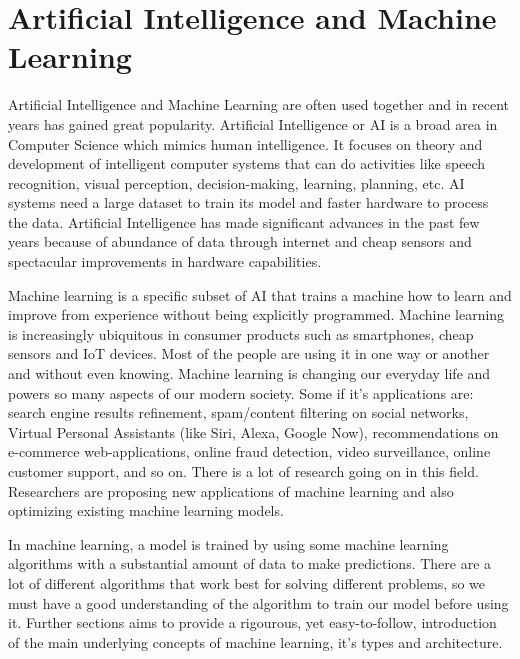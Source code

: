 \section{Artificial Intelligence and Machine Learning}
Artificial Intelligence and Machine Learning are often used together and in recent years has gained great popularity. Artificial Intelligence or AI is a broad area in Computer Science which mimics human intelligence. It focuses on theory and development of intelligent computer systems that can do activities like speech recognition, visual perception, decision-making, learning, planning, etc. AI systems need a large dataset to train its model and faster hardware to process the data. Artificial Intelligence has made significant advances in the past few years because of abundance of data through internet and cheap sensors and spectacular improvements in hardware capabilities.
\par
Machine learning is a specific subset of AI that trains a machine how to learn and improve from experience without being explicitly programmed. Machine learning is increasingly ubiquitous in consumer products such as smartphones, cheap sensors and IoT devices. Most of the people are using it in one way or another and without even knowing. Machine learning is changing our everyday life and powers so many aspects of our modern society. Some if it's applications are: search engine results refinement, spam/content filtering on social networks, Virtual Personal Assistants (like Siri, Alexa, Google Now), recommendations on e-commerce web-applications, online fraud detection, video surveillance, online customer support, and so on. There is a lot of research going on in this field. Researchers are proposing new applications of machine learning and also optimizing existing machine learning models.
\par
In machine learning, a model is trained by using some machine learning algorithms with a substantial amount of data to make predictions. There are a lot of different algorithms that work best for solving different problems, so we must have a good understanding of the algorithm to train our model before using it. Further sections aims to provide a rigourous, yet easy-to-follow, introduction of the main underlying concepts of machine learning, it's types and architecture.

